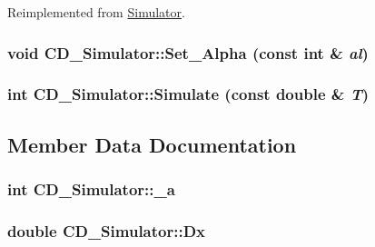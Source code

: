 Reimplemented from \hyperlink{class_simulator_2cc53f33162bf08a6ae187ad4d34fe6e}{Simulator}.\hypertarget{class_c_d___simulator_6f78aafc96ae191c7b9815055ce4e956}{
\subsubsection[{Set\_\-Alpha}]{\setlength{\rightskip}{0pt plus 5cm}void CD\_\-Simulator::Set\_\-Alpha (const int \& {\em al})}}
\label{class_c_d___simulator_6f78aafc96ae191c7b9815055ce4e956}


\hypertarget{class_c_d___simulator_fde7cba27399a95337431770b42b3772}{
\subsubsection[{Simulate}]{\setlength{\rightskip}{0pt plus 5cm}int CD\_\-Simulator::Simulate (const double \& {\em T})}}
\label{class_c_d___simulator_fde7cba27399a95337431770b42b3772}




\subsection{Member Data Documentation}
\hypertarget{class_c_d___simulator_f9d59b82e56e035230af9cf7d7767a9c}{
\subsubsection[{\_\-a}]{\setlength{\rightskip}{0pt plus 5cm}int {\bf CD\_\-Simulator::\_\-a}}}
\label{class_c_d___simulator_f9d59b82e56e035230af9cf7d7767a9c}


\hypertarget{class_c_d___simulator_adb3b1b1b8bd6deabea8a62fcec33138}{
\subsubsection[{Dx}]{\setlength{\rightskip}{0pt plus 5cm}double {\bf CD\_\-Simulator::Dx}}}
\label{class_c_d___simulator_adb3b1b1b8bd6deabea8a62fcec33138}


